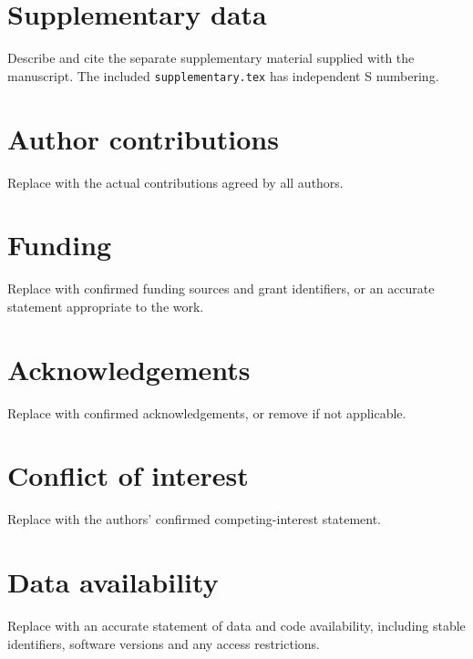 \documentclass[unnumsec,webpdf,contemporary,large]{oup-authoring-template}
\begin{document}
\section*{Supplementary data}
Describe and cite the separate supplementary material supplied with the
manuscript. The included \texttt{supplementary.tex} has independent S numbering.

\section*{Author contributions}
Replace with the actual contributions agreed by all authors.

\section*{Funding}
Replace with confirmed funding sources and grant identifiers, or an accurate
statement appropriate to the work.

\section*{Acknowledgements}
Replace with confirmed acknowledgements, or remove if not applicable.

\section*{Conflict of interest}
Replace with the authors' confirmed competing-interest statement.

\section*{Data availability}
Replace with an accurate statement of data and code availability, including
stable identifiers, software versions and any access restrictions.



\end{document}
